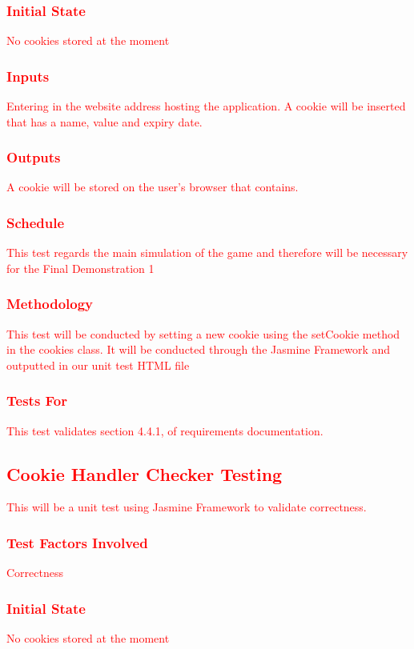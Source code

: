\documentclass[11pt, oneside]{article}   	%
\begin{document}
\subsubsection{\textcolor{red}{Initial State}}
\textcolor{red}{No cookies stored at the moment}
\subsubsection{\textcolor{red}{Inputs}}
\textcolor{red}{Entering in the website address hosting the application. A  cookie will be inserted that has a name, value and expiry date.}
\subsubsection{\textcolor{red}{Outputs}}
\textcolor{red}{A cookie will be stored on the user's browser that contains.}

\subsubsection{\textcolor{red}{Schedule}}
\textcolor{red}{This test regards the main simulation of the game and therefore will be necessary for the Final Demonstration 1}
\subsubsection{\textcolor{red}{Methodology}}
\textcolor{red}{This test will be conducted by setting a new cookie using the setCookie method in the cookies class. It will be conducted through the Jasmine Framework and outputted in our unit test HTML file}
\subsubsection{\textcolor{red}{Tests For}}
\textcolor{red}{This test validates section 4.4.1, of requirements documentation.}



\subsection{\textcolor{red}{Cookie Handler Checker Testing}}
\textcolor{red}{This will be a unit test using Jasmine Framework to validate correctness.}
\subsubsection{\textcolor{red}{Test Factors Involved}}
\textcolor{red}{Correctness}
\subsubsection{\textcolor{red}{Initial State}}
\textcolor{red}{No cookies stored at the moment}
\end{document}

